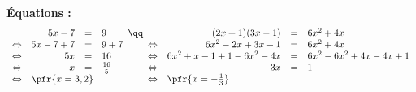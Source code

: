 \documentclass[french,10pt]{article}
\newcommand\Resultat[1]{%
\multicolumn{3}{l}{\pfr{#1}}%
}
\begin{document}
\textbf{\'Equations :}
\[\begin{array}[t]{crcl}
	& 5x - 7 & = & 9 \\
	\Leftrightarrow & 5x - 7 + 7 & = & 9 + 7 \\
	\Leftrightarrow & 5x & = & 16 \\
	\Leftrightarrow & x & = & \frac{16}{5} \\
	\Leftrightarrow & \Resultat{x = 3,2}
\end{array}
\qq
\begin{array}[t]{crcl}
	& (2x + 1)(3x - 1) & = & 6x^2 + 4x \\
	\Leftrightarrow & 6x^2 -2x + 3x - 1  & = & 6x^2 + 4x \\
	\Leftrightarrow & 6x^2 + x - 1 + 1 -6x^2 - 4x & = & 6x^2 - 6x^2 + 4x - 4x + 1  \\
	\Leftrightarrow & -3x & = & 1 \\
	\Leftrightarrow & \Resultat{x = - \frac 1 3}
\end{array}
\]
\end{document}
